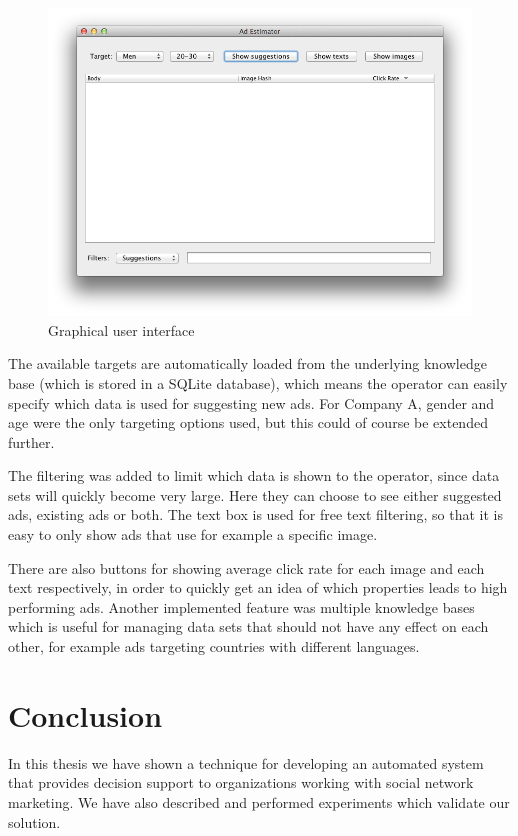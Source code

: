 \documentclass{sig-alternate}
\begin{document}
\begin{figure}[htb]
    \centering
    \includegraphics[width=\columnwidth]{gui-screenshot.png}
    \caption{Graphical user interface}
    \label{fig:GUI}
\end{figure}

The available targets are automatically loaded from the underlying knowledge base (which is stored in a SQLite database), which means the operator can easily specify which data is used for suggesting new ads. For Company A, gender and age were the only targeting options used, but this could of course be extended further.

The filtering was added to limit which data is shown to the operator, since data sets will quickly become very large. Here they can choose to see either suggested ads, existing ads or both. The text box is used for free text filtering, so that it is easy to only show ads that use for example a specific image.

There are also buttons for showing average click rate for each image and each text respectively, in order to quickly get an idea of which properties leads to high performing ads. Another implemented feature was multiple knowledge bases which is useful for managing data sets that should not have any effect on each other, for example ads targeting countries with different languages.

\newpage
\section{Conclusion}
\label{ch:Conclusion}
In this thesis we have shown a technique for developing an automated system that provides decision support to organizations working with social network marketing. We have also described and performed experiments which validate our solution.
\end{document}
